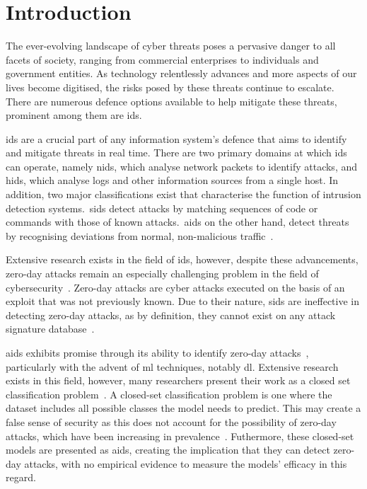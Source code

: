 \chapter{Introduction}%
\label{chp:introduction}

The ever-evolving landscape of cyber threats poses a pervasive danger to all
facets of society, ranging from commercial enterprises to individuals and
government entities. As technology relentlessly advances and more aspects of
our lives become digitised, the risks posed by these threats continue to
escalate. There are numerous defence options available to help mitigate these
threats, prominent among them are \gls{ids}.

\gls{ids} are a crucial part of any information system's defence that aims to
identify and mitigate threats in real time. There are two primary domains at
which \gls{ids} can operate, namely \gls{nids}, which analyse
network packets to identify attacks, and \gls{hids}, which analyse logs and
other information sources from a single host. In addition, two major
classifications exist that characterise the function of intrusion detection
systems.\ \gls{sids} detect attacks by matching sequences of code or commands
with those of known attacks.\ \gls{aids} on the other hand, detect threats by
recognising deviations from normal, non-malicious traffic~\cite{survey1}.

Extensive research exists in the field of \gls{ids}, however, despite these
advancements, zero-day attacks remain an especially challenging problem in the
field of cybersecurity~\cite{zero-day}. Zero-day attacks are cyber attacks
executed on the basis of an exploit that was not previously known. Due to their
nature, \gls{sids} are ineffective in detecting zero-day attacks, as by
definition, they cannot exist on any attack signature database~\cite{survey1}.

\gls{aids} exhibits promise through its ability to identify zero-day
attacks~\cite{aids-zero-day}, particularly with the advent of \gls{ml}
techniques, notably \gls{dl}. Extensive research exists in this field, however,
many researchers present their work as a closed set classification
problem~\cite{zero-day}. A closed-set classification problem is one where the
dataset includes all possible classes the model needs to predict. This may
create a false sense of security as this does not account for the possibility
of zero-day attacks, which have been increasing in prevalence~\cite{symantec2017}.
Futhermore, these closed-set models are presented as \gls{aids}, creating the
implication that they can detect zero-day attacks, with no empirical evidence
to measure the models' efficacy in this regard.
